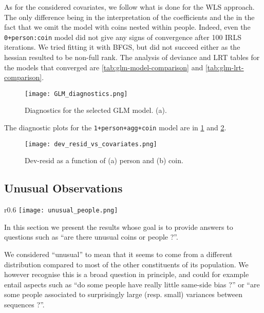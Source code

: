 \documentclass[a4paper, 12pt,oneside]{article}
\begin{document}
			As for the considered covariates, we follow what is done for the WLS approach. The only difference being in the interpretation of the coefficients and the in the fact that we omit the model with coins nested within people. Indeed, even the \texttt{0+person:coin} model did not give any signs of convergence after 100 IRLS iterations. We tried fitting it with BFGS, but did not succeed either as the hessian resulted to be non-full rank. The analysis of deviance and LRT tables for the models that converged are \ref{tab:glm-model-comparison} and \ref{tab:glm-lrt-comparison}.
			\begin{figure}[htb]
				\centering
				\texttt{[image: GLM\_diagnostics.png]}
				\caption{Diagnostics for the selected GLM model. (a).}
				\label{fig:glm-diagnostic}
			\end{figure}
			The diagnostic plots for the \texttt{1+person+agg+coin} model are in \ref{fig:glm-diagnostic} and \ref{fig:dev-resid-vs-covariates}. 
			\begin{figure}[htb]
				\centering
				\texttt{[image: dev\_resid\_vs\_covariates.png]}
				\caption{Dev-resid as a function of (a) person and (b) coin.}
				\label{fig:dev-resid-vs-covariates}
			\end{figure}	
		\newpage
		\subsection{Unusual Observations}
		\begin{wrapfigure}[15]{r}{0.6\textwidth}
			\vspace{-2em}
			\centering
			\texttt{[image: unusual\_people.png]}
			\caption{Distribution inspection for estimated person-parameters in the \texttt{1+person+coin} GLM model.}
			\label{fig:unusual-persons}
		\end{wrapfigure}
		In this section we present the results whose goal is to provide answers to questions such as ``are there unusual coins or people ?''. 
		
		We considered ``unusual'' to mean that it seems to come from a different distribution compared to most of the other constituents of its population. We however recognise this is a broad question in principle, and could for example entail aspects such as ``do some people have really little same-side bias ?'' or ``are some people associated to surprisingly large (resp. small) variances between sequences ?''.
\end{document}
